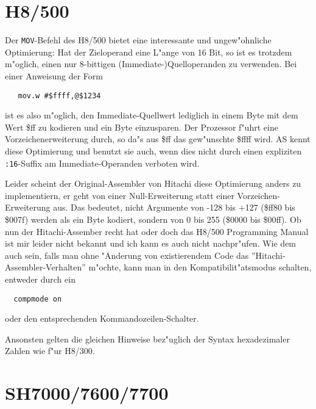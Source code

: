 \documentclass[12pt,a4paper,twoside]{report}
\newcommand{\tty}[1]{{\tt #1}}
\begin{document}

\section{H8/500}

Der {\tt MOV}-Befehl des H8/500 bietet eine interessante und ungew"ohnliche
Optimierung: Hat der Zieloperand eine L"ange von 16 Bit, so ist es trotzdem
m"oglich, einen nur 8-bittigen (Immediate-)Quelloperanden zu verwenden.  Bei
einer Anweisung der Form
\begin{verbatim}
   mov.w #$ffff,@$1234
\end{verbatim}
ist es also m"oglich, den Immediate-Quellwert lediglich in einem Byte mit
dem Wert \$ff zu kodieren und ein Byte einzusparen.  Der Prozessor f"uhrt
eine Vorzeichenerweiterung durch, so da"s aus \$ff das gew"unschte \$ffff
wird.  AS kennt diese Optimierung und benutzt sie auch, wenn dies nicht
durch einen expliziten \tty{:16}-Suffix am Immediate-Operanden verboten
wird.

Leider scheint der Original-Assembler von Hitachi diese Optimierung anders
zu implementiern, er geht von einer Null-Erweiterung statt einer Vorzeichen-
Erweiterung aus.  Das bedeutet, nicht Argumente von -128 bis +127 (\$ff80 bis
\$007f) werden als ein Byte kodiert, sondern von 0 bis 255 (\$0000 bis \$00ff).
Ob nun der Hitachi-Assember recht hat oder doch das H8/500 Programming
Manual ist mir leider nicht bekannt und ich kann es auch nicht nachpr"ufen.
Wie dem auch sein, falls man ohne "Anderung von existierendem Code das
''Hitachi-Assembler-Verhalten'' m"ochte, kann man in den Kompatibilit"atsmodus
schalten, entweder durch ein
\begin{verbatim}
  compmode on
\end{verbatim}
oder den entsprechenden Kommandozeilen-Schalter.

Ansonsten gelten die gleichen Hinweise bez"uglich der Syntax hexadezimaler
Zahlen wie f"ur H8/300.


\section{SH7000/7600/7700}
\end{document}
